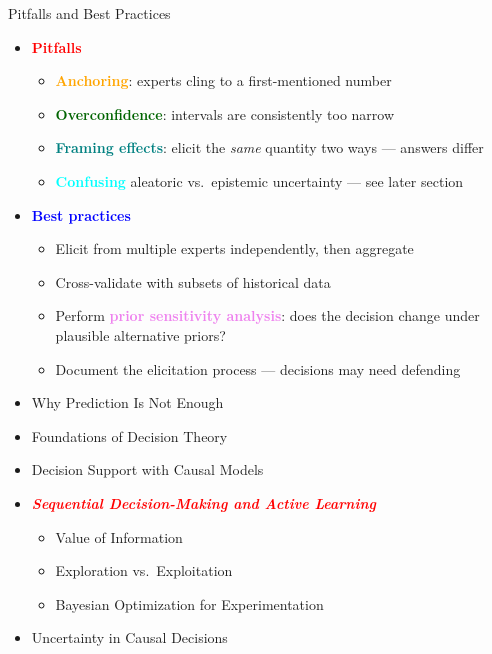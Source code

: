 \documentclass[
  10pt,
  ignorenonframetext,
]{beamer}
\providecommand{\tightlist}{%
  \setlength{\itemsep}{0pt}\setlength{\parskip}{0pt}}
\begin{document}
\begin{frame}{Pitfalls and Best Practices}
\label{pitfalls-and-best-practices}
\begin{itemize}
\tightlist
\item
  \textbf{\textcolor{red}{Pitfalls}}

  \begin{itemize}
  \tightlist
  \item
    \textbf{\textcolor{orange}{Anchoring}}: experts cling to a
    first-mentioned number
  \item
    \textbf{\textcolor{darkgreen}{Overconfidence}}: intervals are
    consistently too narrow
  \item
    \textbf{\textcolor{teal}{Framing effects}}: elicit the \emph{same}
    quantity two ways --- answers differ
  \item
    \textbf{\textcolor{cyan}{Confusing}} aleatoric vs.~epistemic
    uncertainty --- see later section
  \end{itemize}
\item
  \textbf{\textcolor{blue}{Best practices}}

  \begin{itemize}
  \tightlist
  \item
    Elicit from multiple experts independently, then aggregate
  \item
    Cross-validate with subsets of historical data
  \item
    Perform \textbf{\textcolor{violet}{prior sensitivity analysis}}:
    does the decision change under plausible alternative priors?
  \item
    Document the elicitation process --- decisions may need defending
  \end{itemize}
\end{itemize}
\end{frame}

\begin{frame}{}
\label{section-12}
\begin{itemize}
\tightlist
\item
  Why Prediction Is Not Enough
\item
  Foundations of Decision Theory
\item
  Decision Support with Causal Models
\item
  \emph{\textbf{\textcolor{red}{Sequential Decision-Making and Active Learning}}}

  \begin{itemize}
  \tightlist
  \item
    Value of Information
  \item
    Exploration vs.~Exploitation
  \item
    Bayesian Optimization for Experimentation
  \end{itemize}
\item
  Uncertainty in Causal Decisions
\end{itemize}
\end{frame}
\end{document}
